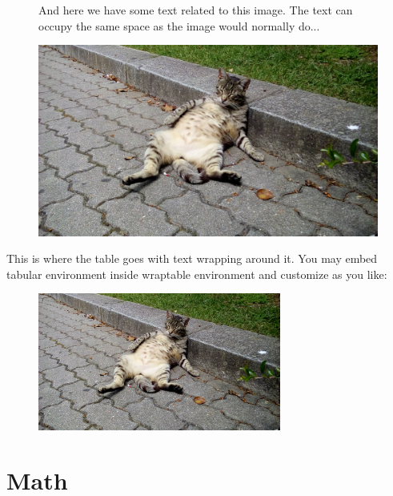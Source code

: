 \begin{figure}
\centering
\begin{minipage}{.49\textwidth}
  And here we have some text related to this image. The text can occupy the same space as the image would normally do...
\end{minipage}%
\hfill
\begin{minipage}{.49\textwidth}
  \centering
  \includegraphics[width=.95\linewidth]{Figures/ChapterTemplate/20160517_123609.jpg}
\end{minipage}
\end{figure}

This is where the table goes with text wrapping around it. You may 
embed tabular environment inside wraptable environment and customize as you like: 
\begin{figure}
  \includegraphics[width=8cm]{Figures/ChapterTemplate/20160517_123609.jpg}
\end{figure} 
\lipsum[2-3]

\section{Math}


